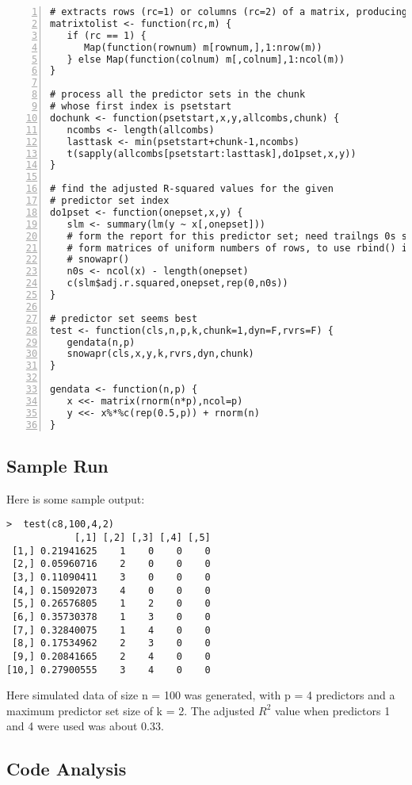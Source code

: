 \begin{lstlisting}[numbers=left]
# extracts rows (rc=1) or columns (rc=2) of a matrix, producing a list
matrixtolist <- function(rc,m) {
   if (rc == 1) {
      Map(function(rownum) m[rownum,],1:nrow(m))
   } else Map(function(colnum) m[,colnum],1:ncol(m))
}

# process all the predictor sets in the chunk 
# whose first index is psetstart
dochunk <- function(psetstart,x,y,allcombs,chunk) {
   ncombs <- length(allcombs)
   lasttask <- min(psetstart+chunk-1,ncombs)
   t(sapply(allcombs[psetstart:lasttask],do1pset,x,y))
}

# find the adjusted R-squared values for the given 
# predictor set index
do1pset <- function(onepset,x,y) {
   slm <- summary(lm(y ~ x[,onepset]))
   # form the report for this predictor set; need trailngs 0s so as to
   # form matrices of uniform numbers of rows, to use rbind() in
   # snowapr()
   n0s <- ncol(x) - length(onepset)
   c(slm$adj.r.squared,onepset,rep(0,n0s))
}

# predictor set seems best
test <- function(cls,n,p,k,chunk=1,dyn=F,rvrs=F) {
   gendata(n,p)
   snowapr(cls,x,y,k,rvrs,dyn,chunk)
}

gendata <- function(n,p) {
   x <<- matrix(rnorm(n*p),ncol=p)
   y <<- x%*%c(rep(0.5,p)) + rnorm(n)
}
\end{lstlisting}

\subsection{Sample Run}
\label{samplerun}

Here is some sample output:

\begin{Verbatim}[fontsize=\relsize{-1}]
>  test(c8,100,4,2)
            [,1] [,2] [,3] [,4] [,5]
 [1,] 0.21941625    1    0    0    0
 [2,] 0.05960716    2    0    0    0
 [3,] 0.11090411    3    0    0    0
 [4,] 0.15092073    4    0    0    0
 [5,] 0.26576805    1    2    0    0
 [6,] 0.35730378    1    3    0    0
 [7,] 0.32840075    1    4    0    0
 [8,] 0.17534962    2    3    0    0
 [9,] 0.20841665    2    4    0    0
[10,] 0.27900555    3    4    0    0
\end{Verbatim}

Here simulated data of size n = 100 was generated, with p = 4 predictors
and a maximum predictor set size of k = 2.  The adjusted $R^2$ value
when predictors 1 and 4 were used was about 0.33.

\subsection{Code Analysis}

